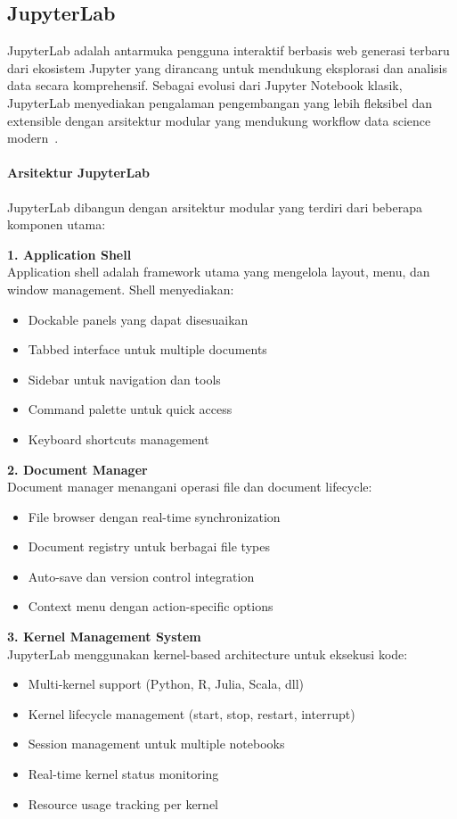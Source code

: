 \subsection{JupyterLab}

JupyterLab adalah antarmuka pengguna interaktif berbasis web generasi terbaru dari ekosistem Jupyter yang dirancang untuk mendukung eksplorasi dan analisis data secara komprehensif. Sebagai evolusi dari Jupyter Notebook klasik, JupyterLab menyediakan pengalaman pengembangan yang lebih fleksibel dan extensible dengan arsitektur modular yang mendukung workflow data science modern~\citep{JupyterLabTeam2024}.

\paragraph{Arsitektur JupyterLab}

JupyterLab dibangun dengan arsitektur modular yang terdiri dari beberapa komponen utama:

\textbf{1. Application Shell}\\
Application shell adalah framework utama yang mengelola layout, menu, dan window management. Shell menyediakan:
\begin{itemize}
\item Dockable panels yang dapat disesuaikan
\item Tabbed interface untuk multiple documents
\item Sidebar untuk navigation dan tools
\item Command palette untuk quick access
\item Keyboard shortcuts management
\end{itemize}

\textbf{2. Document Manager}\\
Document manager menangani operasi file dan document lifecycle:
\begin{itemize}
\item File browser dengan real-time synchronization
\item Document registry untuk berbagai file types
\item Auto-save dan version control integration
\item Context menu dengan action-specific options
\end{itemize}

\textbf{3. Kernel Management System}\\
JupyterLab menggunakan kernel-based architecture untuk eksekusi kode:
\begin{itemize}
\item Multi-kernel support (Python, R, Julia, Scala, dll)
\item Kernel lifecycle management (start, stop, restart, interrupt)
\item Session management untuk multiple notebooks
\item Real-time kernel status monitoring
\item Resource usage tracking per kernel
\end{itemize}

